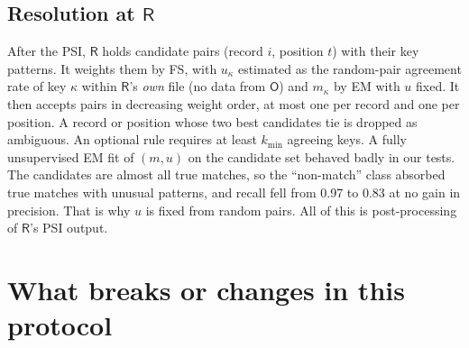 \documentclass[10pt]{article}
\newcommand{\Rp}{\mathsf{R}}
\newcommand{\Op}{\mathsf{O}}
\begin{document}
\subsection{Resolution at $\Rp$}
\label{sec:resolve}
After the PSI, $\Rp$ holds candidate pairs (record $i$, position $t$) with their key patterns. It weights them by FS, with $u_\kappa$ estimated as the random-pair agreement rate of key $\kappa$ within $\Rp$'s \emph{own} file (no data from $\Op$) and $m_\kappa$ by EM with $u$ fixed. It then accepts pairs in decreasing weight order, at most one per record and one per position. A record or position whose two best candidates tie is dropped as ambiguous. An optional rule requires at least $k_{\min}$ agreeing keys. A fully unsupervised EM fit of $(m,u)$ on the candidate set behaved badly in our tests. The candidates are almost all true matches, so the ``non-match'' class absorbed true matches with unusual patterns, and recall fell from 0.97 to 0.83 at no gain in precision. That is why $u$ is fixed from random pairs. All of this is post-processing of $\Rp$'s PSI output.

\section{What breaks or changes in this protocol}
\label{sec:changes}
\end{document}

